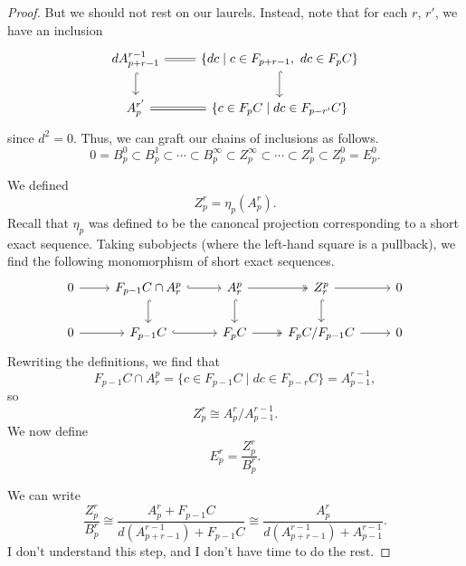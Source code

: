 \documentclass[main.tex]{subfiles}
\begin{document}
\begin{proof}
  But we should not rest on our laurels. Instead, note that for each $r$, $r'$, we have an inclusion
  \begin{equation*}
    \begin{tikzcd}
      dA^{r-1}_{p+r-1}
      \arrow[r, equals]
      \arrow[d, hook]
      & \{dc \mid c \in F_{p+r-1},\ dc \in F_{p}C\}
      \arrow[d, hook]
      \\
      A^{r'}_{p}
      \arrow[r, equals]
      & \{c \in F_{p}C \mid dc \in F_{p-r'}C\}
    \end{tikzcd}
  \end{equation*}
  since $d^{2} = 0$. Thus, we can graft our chains of inclusions as follows.
  \begin{equation*}
    0 = B^{0}_{p} \subset B^{1}_{p} \subset \cdots \subset B^{\infty}_{p} \subset Z^{\infty}_{p} \subset \cdots \subset Z^{1}_{p} \subset Z^{0}_{p} = E^{0}_{p}.
  \end{equation*}

  We defined
  \begin{equation*}
    Z^{r}_{p} = \eta_{p}(A^{r}_{p}).
  \end{equation*}
  Recall that $\eta_{p}$ was defined to be the canoncal projection corresponding to a short exact sequence. Taking subobjects (where the left-hand square is a pullback), we find the following monomorphism of short exact sequences.
  \begin{equation*}
    \begin{tikzcd}
      0
      \arrow[r]
      & F_{p-1}C \cap A^{p}_{r}
      \arrow[r, hook]
      \arrow[d, hook]
      & A^{p}_{r}
      \arrow[r, two heads]
      \arrow[d, hook]
      & Z^{p}_{r}
      \arrow[r]
      \arrow[d, hook]
      & 0
      \\
      0
      \arrow[r]
      & F_{p-1}C
      \arrow[r, hook]
      & F_{p}C
      \arrow[r, two heads]
      & F_{p}C/F_{p-1}C
      \arrow[r]
      & 0
    \end{tikzcd}
  \end{equation*}
  Rewriting the definitions, we find that
  \begin{equation*}
    F_{p-1}C \cap A^{p}_{r} = \{c \in F_{p-1}C \mid dc \in F_{p-r}C\} = A^{r-1}_{p-1},
  \end{equation*}
  so
  \begin{equation*}
    Z^{r}_{p} \cong A^{r}_{p}/A^{r-1}_{p-1}.
  \end{equation*}
  We now define
  \begin{equation*}
    E^{r}_{p} = \frac{Z^{r}_{p}}{B^{r}_{p}}.
  \end{equation*}

  We can write
  \begin{equation*}
    \frac{Z^{r}_{p}}{B^{r}_{p}} \cong \frac{A^{r}_{p} + F_{p-1}C}{d(A^{r-1}_{p+r-1}) + F_{p-1}C} \cong \frac{A^{r}_{p}}{d(A^{r-1}_{p+r-1}) + A^{r-1}_{p-1}}.
  \end{equation*}
  I don't understand this step, and I don't have time to do the rest.
\end{proof}
\end{document}
